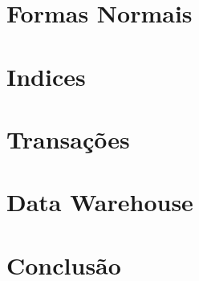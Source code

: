 \documentclass[11pt,a4paper]{article}
\begin{document}
\section{Formas Normais}\newpage
\newpage

\section{Indices}
\newpage

\section{Transações}
\newpage

\section{Data Warehouse}
\newpage

\section{Conclusão}
\newpage
\end{document}
